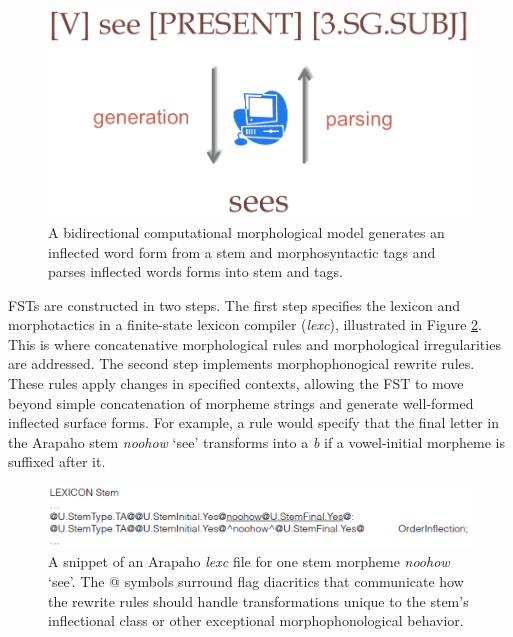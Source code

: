 \documentclass[12pt]{article}
\begin{document}
\begin{figure}[ht]
\label{fig:bidir}
\begin{center}
\includegraphics[width=0.5\columnwidth]{bidirectional.PNG}
\caption{A bidirectional computational morphological model generates an inflected word form from a stem and morphosyntactic tags and parses inflected words forms into stem and tags.}
\end{center}
\end{figure}

FSTs are constructed in two steps. The first step specifies the lexicon and morphotactics in a finite-state lexicon compiler ({\it lexc}), illustrated in Figure \ref{fig:lexc}. This is where concatenative morphological rules and morphological irregularities are addressed. The second step implements morphophonogical rewrite rules. These rules apply changes in specified contexts, allowing the FST to move beyond simple concatenation of morpheme strings and generate well-formed inflected surface forms. For example, a rule would specify that the final letter in the Arapaho stem \textit{noohow} `see' transforms into a \textit{b} if a vowel-initial morpheme is suffixed after it.
\bigskip
\begin{figure}[ht]
\label{fig:lexc}
\begin{center}
\includegraphics[width=0.95\columnwidth]{FSTlexicon.PNG}
\caption{A snippet of an Arapaho \textit{lexc} file for one stem morpheme \textit{noohow} `see'. The @ symbols surround flag diacritics that communicate how the rewrite rules should handle transformations unique to the stem's inflectional class or other exceptional morphophonological behavior.}
\end{center}
\end{figure}
\end{document}
